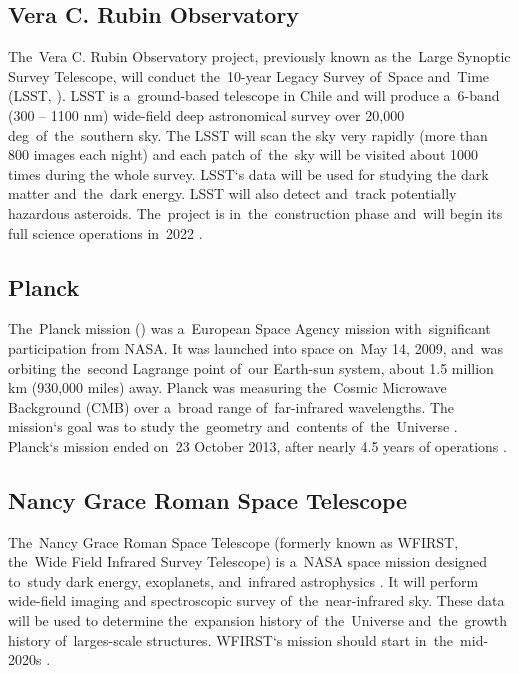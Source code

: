 \subsection{Vera C. Rubin Observatory}
The~Vera C. Rubin Observatory project, previously known as the~Large Synoptic Survey Telescope, will conduct the~10-year Legacy Survey of~Space and~Time (LSST, \cite{lsst}). LSST is a~ground-based telescope in Chile and will produce a~6-band (300 -- 1100 nm) wide-field deep astronomical survey over 20,000 deg\sq\ of~the~southern sky. The LSST will scan the sky very rapidly (more than 800 images each night) and each patch of~the~sky will be visited about 1000 times during the whole survey. LSST`s data will be used for studying the dark matter and~the~dark energy. LSST will also detect and~track potentially hazardous asteroids. The~project is in~the~construction phase and~will begin its full science operations in~2022 \parencite{lsst_web}.
\subsection{Planck}
The~Planck mission (\cite{planck}) was a~European Space Agency mission with~significant participation from NASA. It was launched into space on~May 14, 2009, and~was orbiting the~second Lagrange point of~our Earth-sun system, about 1.5 million km (930,000 miles) away. Planck was measuring the~Cosmic Microwave Background (CMB) over a~broad range of~far-infrared wavelengths. The mission`s goal was to study the~geometry and~contents of~the~Universe \parencite[for results, see][]{planck_cosm}. Planck`s mission ended on~23 October 2013, after nearly 4.5 years of operations \parencite{planck_web}.
\subsection{Nancy Grace Roman Space Telescope}
The~Nancy Grace Roman Space Telescope (formerly known as WFIRST, the~Wide Field Infrared Survey Telescope) is a~NASA space mission designed to~study dark energy, exoplanets, and~infrared astrophysics \parencite{wmap_web}. It will perform wide-field imaging and spectroscopic survey of~the~near-infrared sky. These data will be used to determine the~expansion history of~the~Universe and~the~growth history of~larges-scale structures. WFIRST`s mission should start in~the~mid-2020s \parencite{WFIRST_report}.
